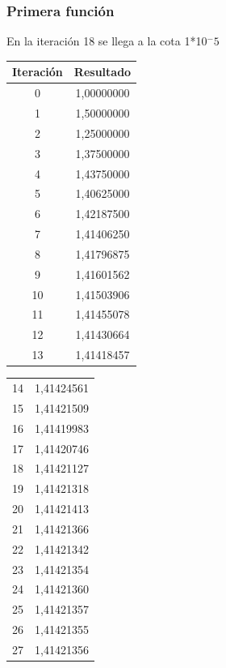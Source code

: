\documentclass[titlepage,a4paper]{article}
\begin{document}
\subsubsection{Primera función}\label{sec:bis1}

En la iteración 18 se llega a la cota 1*10$^-5$
\\
\begin{multicols}{2}
\begin{center}
\begin{tabular}{| c | c |}
\hline
        Iteración & Resultado \\ \hline
        0     & 1,00000000 \\
        1     & 1,50000000 \\
        2     & 1,25000000 \\
        3     & 1,37500000 \\
        4     & 1,43750000 \\
        5     & 1,40625000 \\
        6     & 1,42187500 \\
        7     & 1,41406250 \\
        8     & 1,41796875 \\
        9     & 1,41601562 \\
        10    & 1,41503906 \\
        11    & 1,41455078 \\
        12    & 1,41430664 \\
        13    & 1,41418457 \\
\end{tabular}
\end{center}

\begin{center}
\begin{tabular}{| c | c |}
\hline   
 
        14    & 1,41424561 \\
        15    & 1,41421509 \\
        16    & 1,41419983 \\
        17    & 1,41420746 \\
        18    & 1,41421127 \\
        19    & 1,41421318 \\
        20    & 1,41421413 \\
        21    & 1,41421366 \\
        22    & 1,41421342 \\
        23    & 1,41421354 \\
        24    & 1,41421360 \\
        25    & 1,41421357 \\
        26    & 1,41421355 \\
        27    & 1,41421356 \\ 
        \hline
    \end{tabular}
\end{center}
\end{multicols}
\end{document}
